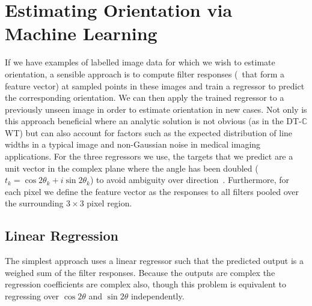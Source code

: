 \documentclass[10pt,twocolumn,letterpaper]{article}
\def\dtcwt{DT-$\mathbb{C}$WT}
\newcommand{\comment}[1]{}
\begin{document}
\section{Estimating Orientation via Machine Learning}
\label{s:learning}
If we have examples of labelled image data for which we wish to estimate orientation, a sensible approach is to compute filter responses (\ie~that form a feature vector) at sampled points in these images and train a regressor to predict the corresponding orientation. We can then apply the trained regressor to a previously unseen image in order to estimate orientation in new cases. Not only is this approach beneficial where an analytic solution is not obvious (as in the \dtcwt) but can also account for factors such as the expected distribution of line widths in a typical image and non-Gaussian noise in medical imaging applications. For the three regressors we use, the targets that we predict are a unit vector in the complex plane where the angle has been doubled (\ie~$t_k = \cos 2\theta_k + i\sin 2\theta_k$) to avoid ambiguity over direction~\cite{Mardia_Jupp_00}. Furthermore, for each pixel we define the feature vector as the responses to all filters pooled over the surrounding $3{\times}3$ pixel region.


\subsection{Linear Regression}
\label{s:learning_linear}
The simplest approach uses a linear regressor such that the predicted output is a weighed sum of the filter responses. Because the outputs are complex the regression coefficients are complex also, though this problem is equivalent to regressing over $\cos 2\theta$ and $\sin 2\theta$ independently.

\end{document}
